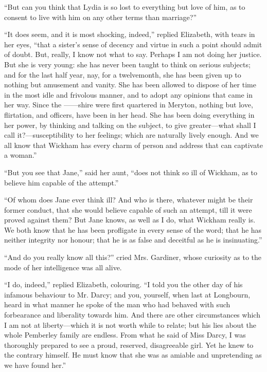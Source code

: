 \documentclass[12pt,openright]{book}
\begin{document}
“But can you think that Lydia is so lost to everything but love of him, as to consent to live with him on any other terms than marriage?”

“It does seem, and it is most shocking, indeed,” replied Elizabeth, with tears in her eyes, “that a sister’s sense of decency and virtue in such a point should admit of doubt. But, really, I know not what to say. Perhaps I am not doing her justice. But she is very young: she has never been taught to think on serious subjects; and for the last half year, nay, for a twelvemonth, she has been given up to nothing but amusement and vanity. She has been allowed to dispose of her time in the most idle and frivolous manner, and to adopt any opinions that came in her way. Since the ——shire were first quartered in Meryton, nothing but love, flirtation, and officers, have been in her head. She has been doing everything in her power, by thinking and talking on the subject, to give greater—what shall I call it?—susceptibility to her feelings; which are naturally lively enough. And we all know that Wickham has every charm of person and address that can captivate a woman.”

“But you see that Jane,” said her aunt, “does not think so ill of Wickham, as to believe him capable of the attempt.”

“Of whom does Jane ever think ill? And who is there, whatever might be their former conduct, that she would believe capable of such an attempt, till it were proved against them? But Jane knows, as well as I do, what Wickham really is. We both know that he has been profligate in every sense of the word; that he has neither integrity nor honour; that he is as false and deceitful as he is insinuating.”

“And do you really know all this?” cried Mrs. Gardiner, whose curiosity as to the mode of her intelligence was all alive.

“I do, indeed,” replied Elizabeth, colouring. “I told you the other day of his infamous behaviour to Mr. Darcy; and you, yourself, when last at Longbourn, heard in what manner he spoke of the man who had behaved with such forbearance and liberality towards him. And there are other circumstances which I am not at liberty—which it is not worth while to relate; but his lies about the whole Pemberley family are endless. From what he said of Miss Darcy, I was thoroughly prepared to see a proud, reserved, disagreeable girl. Yet he knew to the contrary himself. He must know that she was as amiable and unpretending as we have found her.”
\end{document}
